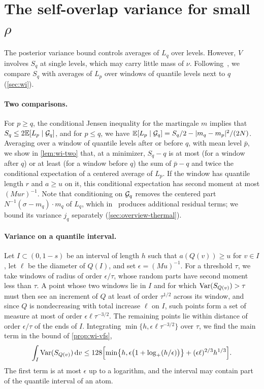 \section{The self-overlap variance for small \texorpdfstring{$\rho$}{rho}}
\label{sec:overview-shells}

The posterior variance bound controls averages of $L_q$ over levels.
However, $V$ involves $S_q$ at single levels, which may carry little
mass of $\nu$. Following~\cite[Lemma~3.3]{AL}, we compare $S_q$ with
averages of $L_p$ over windows of quantile levels next to $q$
(\cref{sec:wi}).

\paragraph{Two comparisons.}
For $p\ge q$, the conditional Jensen inequality for the martingale $m$
implies that $S_q\le2\mathbb E[L_p\mid\mathcal G_q]$, and for $p\le q$, we have
$\mathbb E[L_p\mid\mathcal G_q]=S_q/2-|m_q-m_p|^2/(2N)$. Averaging over a window
of quantile levels after or before $q$, with mean level $\bar p$, we
show in \cref{lem:wi-two} that, at a minimizer, $S_q-q$ is at most
(for a window after $q$) or at least (for a window before $q$) the sum
of $\bar p-q$ and twice the conditional expectation of a centered
average of $L_p$. If the window has quantile length $r$ and $a\ge u$ on
it, this conditional expectation has second moment at most
$(Mur)^{-1}$. Note that conditioning on $\mathcal G_q$ removes the centered part
$N^{-1}(\sigma-m_q)\cdot m_q$ of $L_q$, which in~\cite[Lemma~3.3]{AL}
produces additional residual terms; we bound its variance $j_q$
separately (\cref{sec:overview-thermal}).

\paragraph{Variance on a quantile interval.}
Let $I\subset(0,1-s)$ be an interval of length $h$ such that
$a(Q(v))\ge u$ for $v\in I$, let $\ell$ be the diameter of $Q(I)$, and
set $\epsilon=(Mu)^{-1}$. For a threshold $\tau$, we take windows of
radius of order $\epsilon/\tau$, whose random parts have second moment
less than $\tau$. A point whose two windows lie in $I$ and for which
$\operatorname{Var}(S_{Q(v)})>\tau$ must then see an
increment of $Q$ at least of order $\tau^{1/2}$ across its window, and since $Q$
is nondecreasing with total increase $\ell$ on $I$, such points form a
set of measure at most of order $\epsilon\ell\tau^{-3/2}$. The remaining
points lie within distance of order $\epsilon/\tau$ of the ends of $I$. Integrating
$\min\{h,\epsilon\ell\tau^{-3/2}\}$ over $\tau$, we find the main term
in the bound of \cref{prop:wi-vfs},
\begin{equation}\label{eq:ov-vfs}
 \int_I\operatorname{Var}(S_{Q(v)})\,\mathrm d v
 \le128\Bigl[\min\bigl\{h,\epsilon\bigl(1+\log_+(h/\epsilon)\bigr)\bigr\}
 +(\epsilon\ell)^{2/3}h^{1/3}\Bigr].
\end{equation}
The first term is at most $\epsilon$ up to a logarithm, and the
interval may contain part of the quantile interval of an atom.

